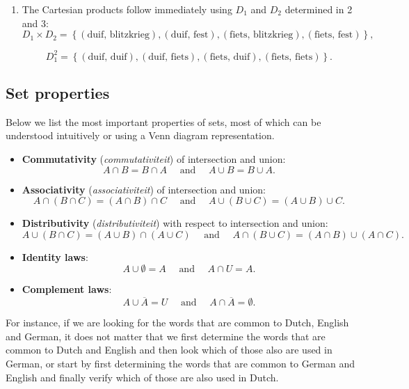 \begin{example}
\begin{enumerate}
		\item  The Cartesian products follow immediately using $D_1$ and $D_2$ determined in 2 and 3: 
		$$
		D_1 \times D_2 = \left\{\left(\mbox{duif, blitzkrieg}\right), \left(\mbox{duif, fest}\right), \left(\mbox{fiets, blitzkrieg}\right), \left(\mbox{fiets, fest}\right)\right\},
		$$
		
		$$
		D_1^2 = \left\{\left(\mbox{duif, duif}\right), \left(\mbox{duif, fiets}\right), \left(\mbox{fiets, duif}\right), \left(\mbox{fiets, fiets}\right)\right\}.
		$$
	\end{enumerate}
	
\end{example}

\fi


\subsection{Set properties}
Below we list the most important properties of sets, most of which can be understood intuitively or using a Venn diagram representation.
\begin{itemize}
	\item \textbf{Commutativity} (\textit{commutativiteit}) of intersection and union:
	$$
	A\cap B=B\cap A \quad\mbox{ and }\quad A\cup B=B\cup A.
	$$
	\item \textbf{Associativity} (\textit{associativiteit})  of intersection and union:
	$$
	A\cap \left(B\cap C\right)=\left(A\cap B\right)\cap C \quad\mbox{ and }\quad A\cup \left(B\cup C\right)=\left(A\cup B\right)\cup C.
	$$
	\item \textbf{Distributivity} (\textit{distributiviteit})  with respect to intersection and union:
	$$
	A\cup \left(B\cap C\right)=\left(A\cup B\right)\cap \left(A\cup C\right) \quad\mbox{ and }\quad A\cap \left(B\cup C\right)=\left(A\cap B\right)\cup \left(A\cap C\right).
	$$
	\item \textbf{Identity laws}:
	$$
	A \cup \emptyset =A \quad\mbox{ and }\quad A \cap U= A.
	$$
	\item \textbf{Complement laws}:
	$$
	A \cup \overline {A} =U \quad\mbox{ and }\quad A \cap \overline {A} = \emptyset. 
	$$
\end{itemize}
For instance, if we are looking for the words that are common to Dutch, English and German, it does not matter that we first determine the words that are common to Dutch and English and then look which of those also are used in German, or start by first determining the words that are common to German and English and finally verify which of those are also used in Dutch. 

